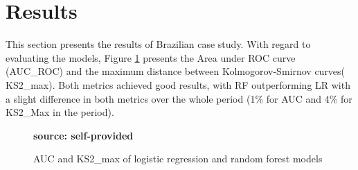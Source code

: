 \section{Results}
This section presents the results of Brazilian case study. With regard to evaluating the models, Figure \ref{fig:auc_ks2_max} presents the Area under ROC curve (AUC\_ROC)\cite{Fawcett2006AnAnalysis} and the maximum distance between Kolmogorov-Smirnov curves(  KS2\_max)\cite{kolmogorov1933sulla}. Both metrics achieved good results, with RF outperforming LR with a slight difference in both metrics over the whole period (1\% for AUC and 4\% for KS2\_Max in the period). 

\begin{figure}[ht!]
\centering
\caption{\textmd{AUC and KS2\_max of logistic regression and random forest models}}
\label{fig:auc_ks2_max}
\par\medskip\ABNTEXfontereduzida\selectfont\textbf{source: self-provided}  
\par\medskip
\end{figure}



